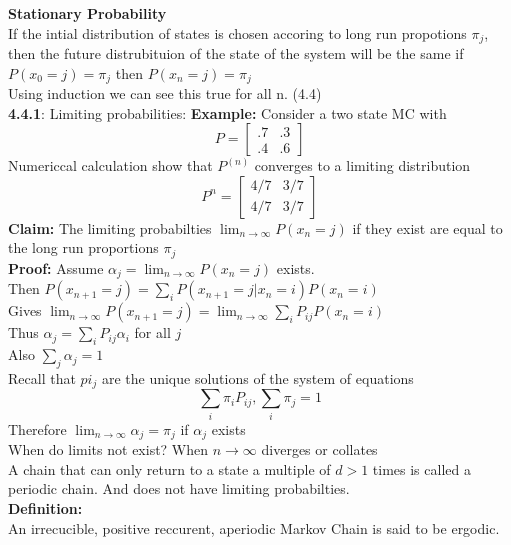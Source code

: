 \documentclass{article}
\begin{document}
\textbf{Stationary Probability}\\
If the intial distribution of states is chosen accoring to long run propotions $\pi_j$, then the future distrubituion of the state of the system will be the same if $P(x_0 = j) = \pi_j$ then $P(x_n = j) = \pi_j$\\
Using induction we can see this true for all n. (4.4)\\

\textbf{4.4.1}:
Limiting probabilities: 
\textbf{Example: } Consider a two state MC with $$P = \begin{bmatrix}
    .7 & .3 \\
    .4 & .6
\end{bmatrix}$$
Numericcal calculation show that $P^{(n)}$ converges to a limiting distribution $$P^n = \begin{bmatrix}
    4/7 & 3/7 \\
    4/7 & 3/7
\end{bmatrix}
$$
\textbf{Claim: } The limiting probabilties $\lim_{n \rightarrow \infty} P(x_n = j) $ if they exist are equal to the long run proportions $\pi_j$\\
\textbf{Proof:} Assume $\alpha_j = \lim_{n \to \infty} P(x_n = j)$ exists.\\
Then $P(x_{n+1} = j) = \sum_{i} P(x_{n+1} = j | x_n = i) P(x_n = i)$\\
Gives $\lim_{n \to \infty} P(x_{n+1} = j) = \lim_{n \to \infty} \sum_{i} P_{ij} P(x_n = i)$\\
Thus $\alpha_j = \sum_{i} P_{ij} \alpha_i$ for all $j$\\
Also $\sum_{j} \alpha_j = 1$\\
Recall that $pi_j$ are the unique solutions of the system of equations $$\sum_{i} \pi_i P_{ij}, \sum_{i}\pi_j = 1$$
Therefore $\lim_{n \rightarrow \infty }\alpha_j = \pi_j$ if $\alpha_j$ exists \\
When do limits not exist? When $n \rightarrow \infty$ diverges or collates \\
A chain that can only return to a state a multiple of $d>1$ times is called a periodic chain. And does not have limiting probabilties.\\
\textbf{Definition: }\\
An irrecucible, positive reccurent, aperiodic Markov Chain is said to be ergodic.\\
\end{document}
